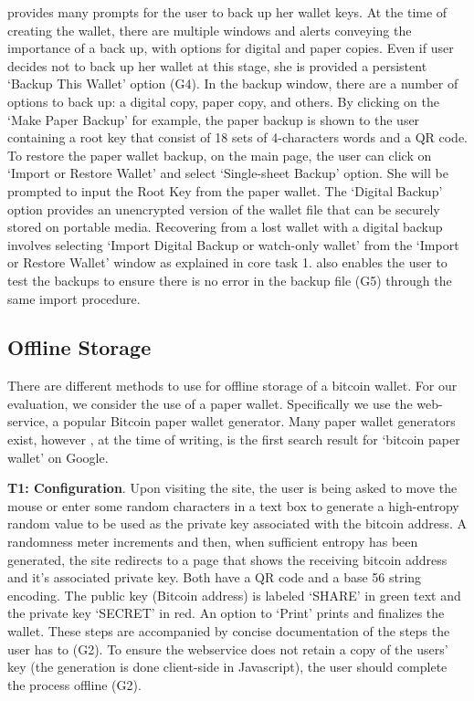 \armory provides many prompts for the user to back up her wallet keys. At the time of creating the wallet, there are multiple windows and alerts conveying the importance of a back up, with options for digital and paper copies. Even if user decides not to back up her wallet at this stage, she is provided a persistent `Backup This Wallet' option (G4). In the backup window, there are a number of options to back up: a digital copy, paper copy, and others. By clicking on the `Make Paper Backup' for example, the paper backup is shown to the user containing a root key that consist of 18 sets of 4-characters words and a QR code. To restore the paper wallet backup, on the main page, the user can click on `Import or Restore Wallet' and select `Single-sheet Backup' option. She will be prompted to input the Root Key from the paper wallet. The `Digital Backup' option provides an unencrypted version of the wallet file that can be securely stored on portable media. Recovering from a lost wallet with a digital backup involves selecting `Import Digital Backup or watch-only wallet' from the `Import or Restore Wallet' window as explained in core task 1. \armory also enables the user to test the backups to ensure there is no error in the backup file (G5) through the same import procedure.

\subsection{Offline Storage}
There are different methods to use for offline storage of a bitcoin wallet. For our evaluation, we consider the use of a paper wallet. Specifically we use the \paper web-service, a popular Bitcoin paper wallet generator. Many paper wallet generators exist, however \paper, at the time of writing, is the first search result for `bitcoin paper wallet' on Google.

\textbf{T1: Configuration}. Upon visiting the site, the user is being asked to move the mouse or enter some random characters in a text box to generate a high-entropy random value to be used as the private key associated with the bitcoin address. A randomness meter increments and then, when sufficient entropy has been generated, the site redirects to a page that shows the receiving bitcoin address and it's associated private key. Both have a QR code and a base 56 string encoding. The public key (Bitcoin address) is labeled `SHARE' in green text and the private key `SECRET' in red. An option to `Print' prints and finalizes the wallet. These steps are accompanied by concise documentation of the steps the user has to (G2). To ensure the webservice does not retain a copy of the users' key (the generation is done client-side in Javascript), the user should complete the process offline (G2).

